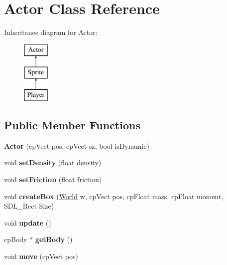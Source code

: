 \hypertarget{classActor}{}\section{Actor Class Reference}
\label{classActor}
Inheritance diagram for Actor\+:\begin{figure}[H]
\begin{center}
\leavevmode
\includegraphics[height=3.000000cm]{classActor}
\end{center}
\end{figure}
\subsection*{Public Member Functions}
\begin{DoxyCompactItemize}
\item 
\hypertarget{classActor_ae9a45ebaba49b13249c0edfa4bf1e2bb}{}{\bfseries Actor} (cp\+Vect pos, cp\+Vect sz, bool is\+Dynamic)\label{classActor_ae9a45ebaba49b13249c0edfa4bf1e2bb}

\item 
\hypertarget{classActor_abc8d269860882fc2832fbfa85d632f20}{}void {\bfseries set\+Density} (float density)\label{classActor_abc8d269860882fc2832fbfa85d632f20}

\item 
\hypertarget{classActor_a7c3ae89083445a199cbdf27194e91dc0}{}void {\bfseries set\+Friction} (float friction)\label{classActor_a7c3ae89083445a199cbdf27194e91dc0}

\item 
\hypertarget{classActor_abb65c8d326472d93b852236685976e12}{}void {\bfseries create\+Box} (\hyperlink{classWorld}{World} w, cp\+Vect pos, cp\+Float mass, cp\+Float moment, S\+D\+L\+\_\+\+Rect Size)\label{classActor_abb65c8d326472d93b852236685976e12}

\item 
\hypertarget{classActor_af10d6f5b2ce4f5ab7a43c813b8b5bf95}{}void {\bfseries update} ()\label{classActor_af10d6f5b2ce4f5ab7a43c813b8b5bf95}

\item 
\hypertarget{classActor_a6bc4555f1e1f649cea66e87f1c283cc3}{}cp\+Body $\ast$ {\bfseries get\+Body} ()\label{classActor_a6bc4555f1e1f649cea66e87f1c283cc3}

\item 
\hypertarget{classActor_a07b5f28631e5f62963657c672e9c8449}{}void {\bfseries move} (cp\+Vect pos)\label{classActor_a07b5f28631e5f62963657c672e9c8449}

\end{DoxyCompactItemize}
